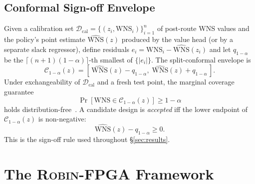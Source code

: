 \documentclass[journal,onecolumn=false]{IEEEtran}
\begin{document}
\subsection{Conformal Sign-off Envelope}
Given a calibration set $\mathcal{D}_{\text{cal}} = \{(z_i, \mathrm{WNS}_i)\}_{i=1}^{n}$ of post-route WNS values and the policy's point estimate $\widehat{\mathrm{WNS}}(z)$ produced by the value head (or by a separate slack regressor), define residuals $e_i = \mathrm{WNS}_i - \widehat{\mathrm{WNS}}(z_i)$ and let $q_{1-\alpha}$ be the $\lceil (n+1)(1-\alpha) \rceil$-th smallest of $\{|e_i|\}$. The split-conformal envelope is
\begin{equation}
\mathcal{C}_{1-\alpha}(z) = \left[\, \widehat{\mathrm{WNS}}(z) - q_{1-\alpha},\; \widehat{\mathrm{WNS}}(z) + q_{1-\alpha}\, \right].
\label{eq:conformal}
\end{equation}
Under exchangeability of $\mathcal{D}_{\text{cal}}$ and a fresh test point, the marginal coverage guarantee
\begin{equation}
\Pr\!\left[\mathrm{WNS} \in \mathcal{C}_{1-\alpha}(z)\right] \geq 1 - \alpha
\label{eq:coverage}
\end{equation}
holds distribution-free~\cite{vovk2022random,angelopoulos2023conformal}. A candidate design is \emph{accepted} iff the lower endpoint of $\mathcal{C}_{1-\alpha}(z)$ is non-negative:
\begin{equation}
\widehat{\mathrm{WNS}}(z) - q_{1-\alpha} \geq 0.
\label{eq:accept}
\end{equation}
This is the sign-off rule used throughout \S\ref{sec:results}.

\section{The \textsc{Robin-FPGA} Framework}
\label{sec:method}
\end{document}

